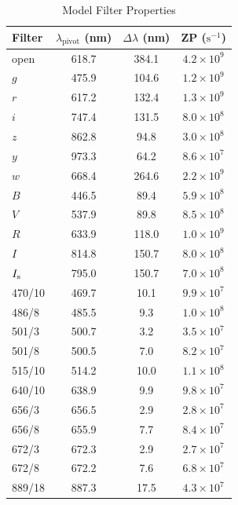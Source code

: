 \begin{table}
\begin{center}
\caption{Model Filter Properties}
\label{table:huitzi-f20-model-filter-properties}
\medskip
\begin{tabular}{lccc}
\hline
Filter&$\lambda_\mathrm{pivot}$ (nm)&$\Delta\lambda$ (nm)&ZP ($\mathrm{s}^{-1}$)\\
\hline
open		& 618.7& \phantom{}384.1&$4.2 \times 10^{9}$\\
$g$		& 475.9& \phantom{}104.6&$1.2 \times 10^{9}$\\
$r$		& 617.2& \phantom{}132.4&$1.3 \times 10^{9}$\\
$i$			& 747.4& \phantom{}131.5&$8.0 \times 10^{8}$\\
$z$		& 862.8& \phantom{0}94.8&$3.0 \times 10^{8}$\\
$y$		& 973.3& \phantom{0}64.2&$8.6 \times 10^{7}$\\
$w$		& 668.4& \phantom{}264.6&$2.2 \times 10^{9}$\\
$B$		& 446.5& \phantom{0}89.4&$5.9 \times 10^{8}$\\
$V$		& 537.9& \phantom{0}89.8&$8.5 \times 10^{8}$\\
$R$		& 633.9& \phantom{}118.0&$1.0 \times 10^{9}$\\
$I$		& 814.8& \phantom{}150.7&$8.0 \times 10^{8}$\\
$\mbox{$I_\mathrm{s}$}$		& 795.0& \phantom{}150.7&$7.0 \times 10^{8}$\\
470/10	& 469.7& \phantom{0}10.1&$9.9 \times 10^{7}$\\
486/8		& 485.5& \phantom{00}9.3&$1.0 \times 10^{8}$\\
501/3		& 500.7& \phantom{00}3.2&$3.5 \times 10^{7}$\\
501/8		& 500.5& \phantom{00}7.0&$8.2 \times 10^{7}$\\
515/10	& 514.2& \phantom{0}10.0&$1.1 \times 10^{8}$\\
640/10	& 638.9& \phantom{00}9.9&$9.8 \times 10^{7}$\\
656/3		& 656.5& \phantom{00}2.9&$2.8 \times 10^{7}$\\
656/8		& 655.9& \phantom{00}7.7&$8.4 \times 10^{7}$\\
672/3		& 672.3& \phantom{00}2.9&$2.7 \times 10^{7}$\\
672/8		& 672.2& \phantom{00}7.6&$6.8 \times 10^{7}$\\
889/18	& 887.3& \phantom{0}17.5&$4.3 \times 10^{7}$\\
\hline
\end{tabular}
\end{center}
\end{table}

